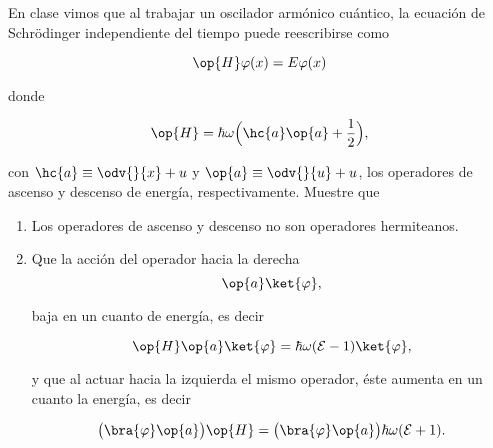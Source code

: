 \documentclass[../main.tex]{subfiles}
\begin{document}
\begin{problema}[30]
	En clase vimos que al trabajar un oscilador armónico cuántico, la ecuación de
	Schrödinger independiente del tiempo puede reescribirse como

	\begin{equation*}
		\op{H}\varphi(x) = E\varphi(x)
	\end{equation*}

	donde

	\begin{equation*}
		\op{H} = \hbar\omega \Bigl(\hc{a}\op{a} + \dfrac{1}{2}\Bigr),
	\end{equation*}

	con \(\hc{a} \equiv \odv{}{x} + u\) y \( \op{a} \equiv \odv{}{u} + u\), los
	operadores de ascenso y descenso de energía, respectivamente. Muestre que

	\begin{enumerate}
		\item Los operadores de ascenso y descenso no son operadores hermiteanos.
		\item Que la acción del operador hacia la derecha
		      \begin{equation*}
			      \op{a} \ket{\varphi},
		      \end{equation*}

		      baja en un cuanto de energía, es decir

		      \begin{equation*}
			      \op{H}\op{a}\ket{\varphi} = \hbar\omega(\mathcal{E} - 1)\ket{\varphi},
		      \end{equation*}

		      y que al actuar hacia la izquierda el mismo operador, éste aumenta en un
		      cuanto la energía, es decir

		      \begin{equation}
			      \bigl(\bra{\varphi}\op{a}\bigr)\op{H} = \bigl(\bra{\varphi}\op{a}\bigr)\hbar\omega(\mathcal{E} + 1).
		      \end{equation}
	\end{enumerate}
\end{problema}
\end{document}
